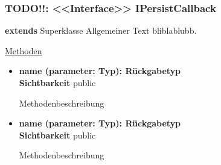 \subsubsection{TODO!!: <<Interface>> IPersistCallback} \label{app:klasse:IPersistCallback}
\textbf{extends} Superklasse \newline
Allgemeiner Text bliblablubb. \newline

\underline{Methoden}
\begin{itemize}
\itemsep0pt
\item \textbf{name (parameter: Typ): Rückgabetyp}\hfill\\
\textbf{Sichtbarkeit} public

Methodenbeschreibung

\item \textbf{name (parameter: Typ): Rückgabetyp}\hfill\\
\textbf{Sichtbarkeit} public

Methodenbeschreibung

\end{itemize}